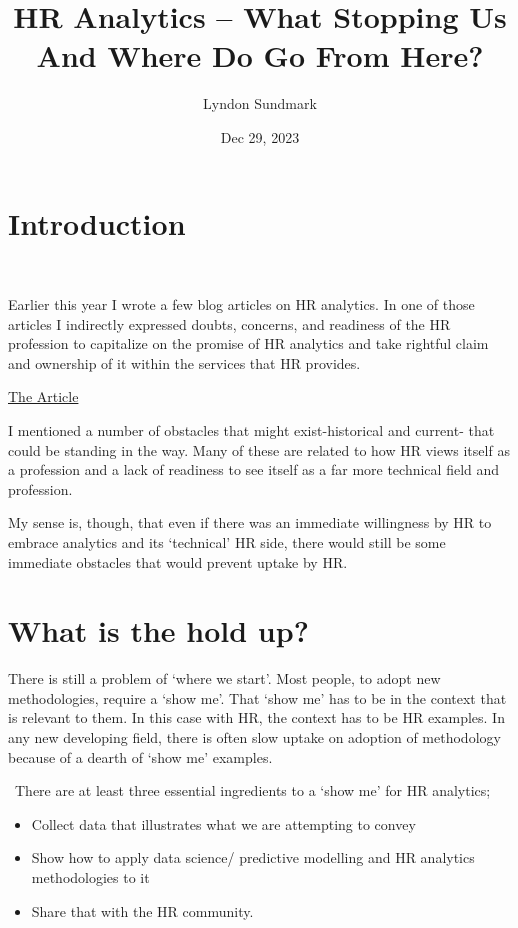 \documentclass[
]{article}
\title{HR Analytics -- What Stopping Us And Where Do Go From
Here?}
\author{Lyndon Sundmark}
\date{Dec 29, 2023}
\begin{document}
\maketitle


\section{Introduction}\label{introduction}

~

Earlier this year I wrote a few blog articles on HR analytics. In one of
those articles I indirectly expressed doubts, concerns, and readiness of
the HR profession to capitalize on the promise of HR analytics and take
rightful claim and ownership of it within the services that HR provides.

\href{https://www.linkedin.com/pulse/why-hr-might-able-reinvent-itself-lyndon-sundmark-mba?trk=mp-reader-card}{The Article}



I mentioned a number of obstacles that might exist-historical and
current- that could be standing in the way. Many of these are related to
how HR views itself as a profession and a lack of readiness to see
itself as a far more technical field and profession.

My sense is, though, that even if there was an immediate willingness by
HR to embrace analytics and its `technical' HR side, there would still
be some immediate obstacles that would prevent uptake by HR.

\section{What is the hold up?}\label{what-is-the-hold-up}

There is still a problem of `where we start'. Most people, to adopt new
methodologies, require a `show me'. That `show me' has to be in the
context that is relevant to them. In this case with HR, the context has
to be HR examples. In any new developing field, there is often slow
uptake on adoption of methodology because of a dearth of `show me'
examples.

~There are at least three essential ingredients to a `show me' for HR
analytics;

\begin{itemize}
\item
  Collect data that illustrates what we are attempting to convey
\item
  Show how to apply data science/ predictive modelling and HR analytics
  methodologies to it
\item
  Share that with the HR community.
\end{itemize}
\end{document}
